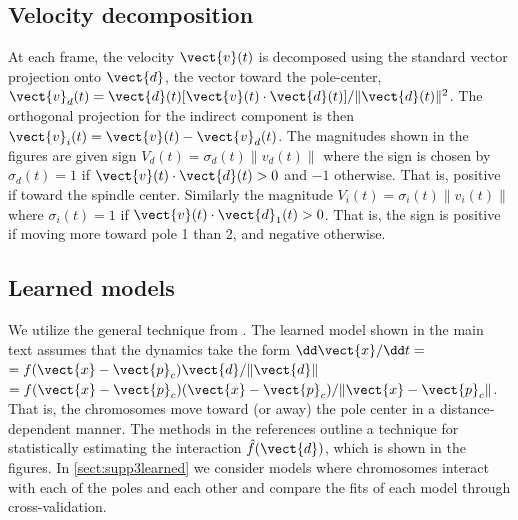 \documentclass[times, twoside,onecolumn]{zHenriquesLab-StyleBioRxiv}
\begin{document}
{\subsection*{Velocity decomposition} At each frame, the velocity $\vect{v}(t)$ is decomposed using the standard vector projection onto $\vect{d}$, the vector toward the pole-center, $\vect{v}_d(t)=\vect{d}(t)[\vect{v}(t) \cdot \vect{d}(t)]/\|\vect{d}(t)\|^2$. The orthogonal projection for the indirect component is then $\vect{v}_i(t) = \vect{v}(t)-\vect{v}_d(t)$. The magnitudes shown in the figures are given sign $V_d(t) = \sigma_d(t)\|v_d(t)\|$ where the sign is chosen by $\sigma_d(t) = 1$ if $\vect{v}(t)\cdot \vect{d}(t)>0$ and $-1$ otherwise. That is, positive if toward the spindle center. Similarly the magnitude $V_i(t)=\sigma_i(t)\|v_i(t)\|$ where $\sigma_i(t)=1$ if $\vect{v}(t)\cdot \vect{d}_1(t)>0$. That is, the sign is positive if moving more toward pole 1 than 2, and negative otherwise. 

\subsection*{Learned models} We utilize the general technique from \cite{Lu2019,Zhong2020}. The learned model shown in the main text assumes that the dynamics take the form  $\dd \vect{x} / \dd t = $ $=f(\vect{x}-\vect{p}_c) \vect{d}/\|\vect{d}\|$ $=f(\vect{x}-\vect{p}_c) (\vect{x}-\vect{p}_c)/\| \vect{x}-\vect{p}_c\| $. That is, the chromosomes move toward (or away) the pole center in a distance-dependent manner. The methods in the references outline a technique for statistically estimating the interaction $\hat{f}(\vect{d})$, which is shown in the figures. In  \cref{sect:supp3learned} we consider models where chromosomes interact with each of the poles and each other and compare the fits of each model through  cross-validation. 

}
\end{document}
